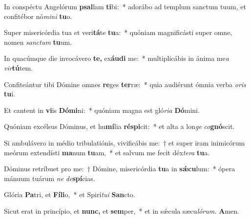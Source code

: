 \item In conspéctu Angelórum \textbf{psal}lam \textbf{ti}bi:~* adorábo ad templum san\-ctum tuum, et confitébor nó\textit{mini} \textbf{tu}o.
\item Super misericórdia tua et veri\textbf{tá}te \textbf{tu}a:~* quóniam magnificásti super omne, nomen \textit{san\-ctum} \textbf{tu}um.
\item In quacúmque die invocávero \textbf{te,} ex\textbf{áu}\textbf{di} me:~* multiplicábis in ánima me\tinyhspace\textit{a} \textit{vir}\textbf{tú}tem.
\item Confiteántur tibi Dómine omnes \textbf{re}ges \textbf{ter}ræ:~* quia audiérunt ómnia verba \textit{oris} \textbf{tu}i.
\item Et cantent in \textbf{vi}is \textbf{Dó}\textbf{mi}ni:~* quóniam magna est gló\textit{ria} \textbf{Dó}mini.
\item Quóniam excélsus Dóminus, et hu\textbf{mí}lia \textbf{ré}\textbf{spi}cit:~* et alta a lon\textit{ge} \textit{co}\textbf{gnó}scit.
\item Si ambulávero in médio tribulatiónis, vivificábis me:~† et super iram inimicórum meórum extendísti \textbf{ma}num \textbf{tu}am,~* et salvum me fecit déx\teenyhspace\textit{tera} \textbf{tu}a.
\item Dóminus retríbuet pro me:~† Dómine, misericórdia \textbf{tu}a in \textbf{sǽ}\textbf{cu}lum:~* ópera mánuum tuárum \textit{ne} \textit{de}\textbf{spí}cias.
\item Glória \textbf{Pa}tri, et \textbf{Fí}\textbf{li}o,~* et Spirí\tinyhspace\textit{tui} \textbf{San}cto.
\item Sicut erat in princípio, et \textbf{nunc,} et \textbf{sem}per,~* et in sǽcula sæcu\tinyhspace\textit{lórum.} \textbf{A}men.